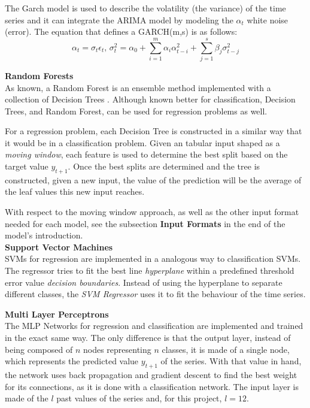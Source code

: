 \documentclass[10pt,twocolumn,letterpaper]{article}
\begin{document}
	
	The Garch model is used to describe the volatility (the variance) of the time series and it can integrate the ARIMA model by modeling the $\alpha_t$ white noise (error). The equation that defines a GARCH(m,s) is as follows:
	\begin{equation}
		\alpha_t=\sigma_t\epsilon_t\mbox{,      }\sigma_t^2=\alpha_0+\sum_{i=1}^{m}\alpha_i\alpha_{t-i}^2+\sum_{j=1}^{s}\beta_j\sigma_{t-j}^2
	\end{equation}
	
	\textbf{Random Forests} \\
	
	As known, a Random Forest is an ensemble method implemented with a collection of Decision Trees \cite{bishop2006pattern}. Although known better for classification, Decision Trees, and Random Forest, can be used for regression problems as well.
	
	For a regression problem, each Decision Tree is constructed in a similar way that it would be in a classification problem. Given an tabular input shaped as a \textit{moving window}, each feature is used to determine the best split based on the target value $y_{t+1}$. Once the best splits are determined and the tree is constructed, given a new input, the value of the prediction will be the average of the leaf values this new input reaches.
	
	With respect to the moving window approach, as well as the other input format needed for each model, see the subsection \textbf{Input Formats} in the end of the model's introduction. \\
	
	\textbf{Support Vector Machines} \\
	
	SVMs for regression are implemented in a analogous way to classification SVMs. The  regressor tries to fit  the best line \textit{hyperplane} within a predefined threshold error value \textit{decision boundaries}. Instead of using the hyperplane to separate different classes, the \textit{SVM Regressor} uses it to fit the behaviour of the time series. 
	
	
	\textbf{Multi Layer Perceptrons}\\
	
	The MLP Networks for regression and classification are implemented and trained in the exact same way. The only difference is that the output layer, instead of being composed of $n$ nodes representing $n$ classes, it is made of a single node, which represents the predicted value $y_{t+1}$ of the series. With that value in hand, the network uses back propagation and gradient descent to find the best weight for its connections, as it is done with a classification network. The input layer is made of the $l$ past values of the series and, for this project, $l=12$.\\
	
\end{document}
